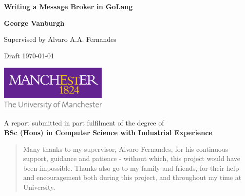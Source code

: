 \documentclass[a4paper,12pt,titlepage]{report}
\begin{document}
  
  

  \begin{titlepage}
    \begin{center}
        \vspace*{1cm}

        \Huge
        \textbf{Writing a Message Broker in GoLang}

        \vspace{2.0cm}
        \LARGE

        \textbf{George Vanburgh}

        \vspace{0.5cm}
        Supervised by Alvaro A.A. Fernandes

        \vspace{0.5cm}
        Draft \today

        \vfill

        \includegraphics[width=0.4\textwidth]{figures/manchesterLogo}

        \vspace{0.8cm}
        \large

        A report submitted in part fulfilment of the degree of \\
        \textbf{BSc (Hons) in Computer Science with Industrial Experience}

    \end{center}
  \end{titlepage}

  \begin{abstract}
    
  \end{abstract}

  \renewcommand{\abstractname}{Acknowledgements}
  \begin{abstract}
    Many thanks to my supervisor, Alvaro Fernandes, for his continuous support,
    guidance and patience - without which, this project would have been
    impossible. Thanks also go to my family and friends, for their help and
    encouragement both during this project, and throughout my time at
    University.
  \end{abstract}

  \tableofcontents
  \begin{versionhistory}
  \end{versionhistory}
\end{document}
